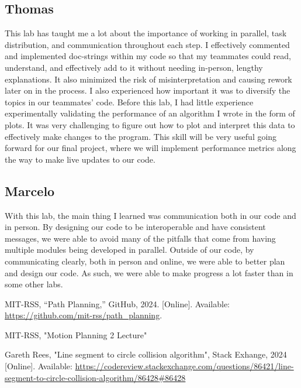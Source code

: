 \documentclass{article}
\begin{document}
\subsection{Thomas}
This lab has taught me a lot about the importance of working in parallel, task distribution, and communication throughout each step. I effectively commented and implemented doc-strings within my code so that my teammates could read, understand, and effectively add to it without needing in-person, lengthy explanations. It also minimized the risk of misinterpretation and causing rework later on in the process. I also experienced how important it was to diversify the topics in our teammates' code. Before this lab, I had little experience experimentally validating the performance of an algorithm I wrote in the form of plots. It was very challenging to figure out how to plot and interpret this data to effectively make changes to the program. This skill will be very useful going forward for our final project, where we will implement performance metrics along the way to make live updates to our code. 

\subsection{Marcelo}
With this lab, the main thing I learned was communication both in our code and in person. By designing our code to be interoperable and have consistent messages, we were able to avoid many of the pitfalls that come from having multiple modules being developed in parallel. Outside of our code, by communicating clearly, both in person and online, we were able to better plan and design our code. As such, we were able to make progress a lot faster than in some other labs.




\begin{thebibliography}{9}

MIT-RSS, ``Path Planning,'' GitHub, 2024. [Online]. Available: \url{https://github.com/mit-rss/path_planning}.

\vspace{0.5cm}

MIT-RSS, "Motion Planning 2 Lecture"

Gareth Rees, "Line segment to circle collision algorithm", Stack Exhange, 2024 [Online]. Available: \url{https://codereview.stackexchange.com/questions/86421/line-segment-to-circle-collision-algorithm/86428#86428}

\end{thebibliography}
\end{document}
